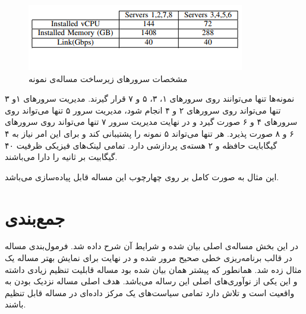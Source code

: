 \begin{figure}[h!]
\center\includegraphics[scale=1]{images/example-spec}
\caption{مشخصات سرورهای زیرساخت مساله‌ی نمونه}
\label{fig.17}
\end{figure}

نمونه‌ها تنها می‌توانند روی سرورهای ۱، ۳، ۵ و ۷ قرار گیرند.
مدیریت سرورهای ۱و ۳ تنها می‌تواند روی سرورهای ۲ و ۴ انجام شود،
مدیریت سرور ۵ تنها می‌تواند روی سرورهای ۴ و ۶ صورت گیرد
و در نهایت مدیریت سرور ۷ تنها می‌تواند روی سرورهای ۶ و ۸ صورت پذیرد.
هر  تنها می‌تواند ۵ نمونه را پشتیبانی کند و
برای این امر نیاز به ۴ گیگابایت حافظه و ۲ هسته‌ی پردازشی دارد.
تمامی لینک‌های فیزیکی ظرفیت ۴۰ گیگابیت بر ثانیه را دارا می‌باشند.

این مثال به صورت کامل بر روی چهارچوب این مساله قابل پیاده‌سازی می‌باشد.

\section{جمع‌بندی}

در این بخش مساله‌ی اصلی بیان شده و شرایط آن شرح داده شد.
فرمول‌بندی مساله در قالب برنامه‌ریزی خطی صحیح مرور شده و در نهایت برای نمایش بهتر مساله یک مثال زده شد.
همانطور که پیشتر همان بیان شده بود مساله قابلیت تنظیم زیادی داشته و این یکی از نوآوری‌های اصلی این رساله می‌باشد.
هدف اصلی مساله نزدیک بودن به واقعیت است و تلاش دارد تمامی سیاست‌های یک مرکز داده‌ای در مساله قابل تنظیم باشند.